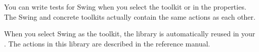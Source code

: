 You can write tests for Swing \gdauts{} when you select the toolkit  or  in the \gdproject{} properties. The Swing and concrete toolkits actually contain the same actions as each other. 

When you select Swing as the \gdproject{} toolkit, the library \gdproject{}  is automatically reused in your \gdproject{}. The actions in this library are described in the reference manual.

